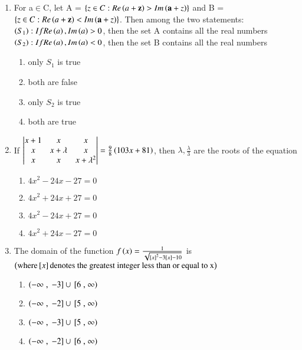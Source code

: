 \documentclass[journal]{IEEEtran}
\numberwithin{equation}{enumi}
\numberwithin{figure}{enumi}
\begin{document}
\begin{enumerate}
\item For a$\in$C, let A = $\left\{z\in C:Re\left(a+\mathbf{z}\right) > Im\left(\mathbf{a}+z\right)\right\}$ and B = $\left\{z\in C:Re\left(a+\mathbf{z}\right) < Im\left(\mathbf{a}+z\right)\right\}$. Then among the two statements: \\
$\left(S_1\right) : If Re\left(a\right), Im\left(a\right) > 0$, then the set A contains all the real numbers \\
$\left(S_2\right) : If Re\left(a\right), Im\left(a\right) < 0$, then the set B contains all the real numbers
\begin{enumerate}
\item only $S_1$ is true
\item both are false
\item only $S_2$ is true
\item both are true
\end{enumerate}

\item If $\begin{vmatrix}x+1 & x & x \\
	x & x+\lambda & x \\
	x & x & x+\lambda^2\end{vmatrix} = \frac{9}{8}\left(103x+81\right)$, then $\lambda,\frac{\lambda}{3}$ are the roots of the equation
\begin{enumerate}
\item $4x^2-24x-27=0$         
\item $4x^2+24x+27=0$
\item $4x^2-24x+27=0$
\item $4x^2+24x-27=0$
\end{enumerate}

\item The domain of the function $f\left(x\right)=\frac{1}{\sqrt{{}\left[x\right]^2-3{}\left[x\right]-10}}$ is $\left(\text{where} {}\left[x\right] \text{denotes the greatest integer less than or equal to x}\right)$
\begin{enumerate}
\item $\left(-\infty\right.,{}\left.-3\right] \cup {}\left[6\right.,\left.\infty\right)$             
\item $\left(-\infty\right.,{}\left.-2\right] \cup {}\left[5\right.,\left.\infty\right)$
\item $\left(-\infty\right.,{}\left.-3\right] \cup {}\left[5\right.,\left.\infty\right)$
\item $\left(-\infty\right.,{}\left.-2\right] \cup {}\left[6\right.,\left.\infty\right)$
\end{enumerate}
\end{enumerate}
\end{document}
